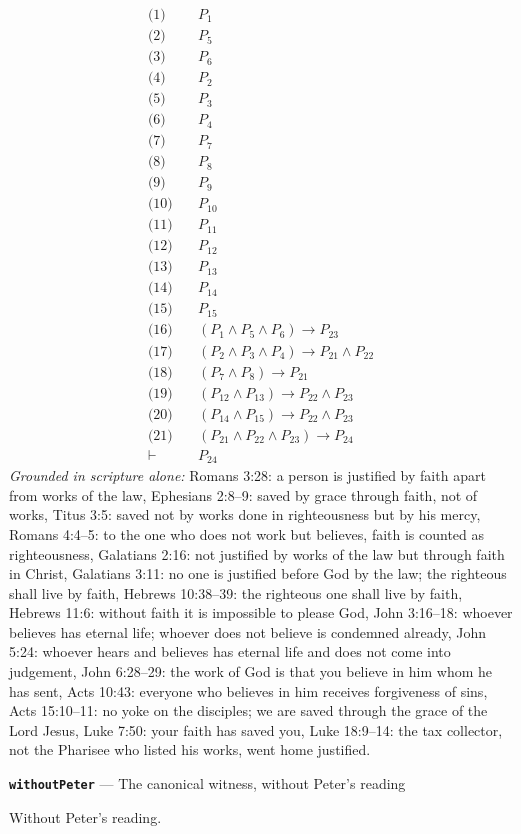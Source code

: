 \documentclass[11pt]{article}
\begin{document}
\begin{align*}
  \text{(1)} \quad & P_{1} \\
  \text{(2)} \quad & P_{5} \\
  \text{(3)} \quad & P_{6} \\
  \text{(4)} \quad & P_{2} \\
  \text{(5)} \quad & P_{3} \\
  \text{(6)} \quad & P_{4} \\
  \text{(7)} \quad & P_{7} \\
  \text{(8)} \quad & P_{8} \\
  \text{(9)} \quad & P_{9} \\
  \text{(10)} \quad & P_{10} \\
  \text{(11)} \quad & P_{11} \\
  \text{(12)} \quad & P_{12} \\
  \text{(13)} \quad & P_{13} \\
  \text{(14)} \quad & P_{14} \\
  \text{(15)} \quad & P_{15} \\
  \text{(16)} \quad & (P_{1} \land P_{5} \land P_{6}) \rightarrow P_{23} \\
  \text{(17)} \quad & (P_{2} \land P_{3} \land P_{4}) \rightarrow P_{21} \land P_{22} \\
  \text{(18)} \quad & (P_{7} \land P_{8}) \rightarrow P_{21} \\
  \text{(19)} \quad & (P_{12} \land P_{13}) \rightarrow P_{22} \land P_{23} \\
  \text{(20)} \quad & (P_{14} \land P_{15}) \rightarrow P_{22} \land P_{23} \\
  \text{(21)} \quad & (P_{21} \land P_{22} \land P_{23}) \rightarrow P_{24} \\
  \vdash \quad & P_{24}
\end{align*}
\emph{Grounded in scripture alone:} Romans 3:28: a person is justified by faith apart from works of the law, Ephesians 2:8–9: saved by grace through faith, not of works, Titus 3:5: saved not by works done in righteousness but by his mercy, Romans 4:4–5: to the one who does not work but believes, faith is counted as righteousness, Galatians 2:16: not justified by works of the law but through faith in Christ, Galatians 3:11: no one is justified before God by the law; the righteous shall live by faith, Hebrews 10:38–39: the righteous one shall live by faith, Hebrews 11:6: without faith it is impossible to please God, John 3:16–18: whoever believes has eternal life; whoever does not believe is condemned already, John 5:24: whoever hears and believes has eternal life and does not come into judgement, John 6:28–29: the work of God is that you believe in him whom he has sent, Acts 10:43: everyone who believes in him receives forgiveness of sins, Acts 15:10–11: no yoke on the disciples; we are saved through the grace of the Lord Jesus, Luke 7:50: your faith has saved you, Luke 18:9–14: the tax collector, not the Pharisee who listed his works, went home justified.
\par\medskip\noindent\textbf{\texttt{without\allowbreak{}Peter}} --- The canonical witness, without Peter's reading\par\nobreak\noindent
Without Peter's reading.
\end{document}
